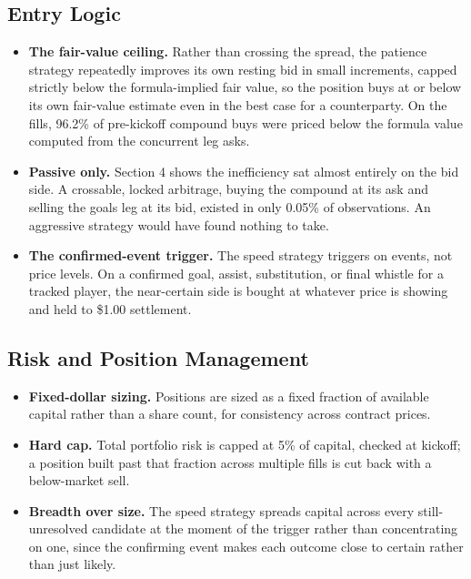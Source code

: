 \documentclass[12pt]{article}
\begin{document}
\subsection{Entry Logic}
\begin{itemize}
\item \textbf{The fair-value ceiling.} Rather than crossing the spread, the
patience strategy repeatedly improves its own resting bid in small increments,
capped strictly below the formula-implied fair value, so the position buys at or
below its own fair-value estimate even in the best case for a counterparty. On
the fills, 96.2\% of pre-kickoff compound buys were priced below the formula
value computed from the concurrent leg asks.
\item \textbf{Passive only.} Section 4 shows the inefficiency sat almost entirely
on the bid side. A crossable, locked arbitrage, buying the compound at its ask
and selling the goals leg at its bid, existed in only 0.05\% of observations. An
aggressive strategy would have found nothing to take.
\item \textbf{The confirmed-event trigger.} The speed strategy triggers on
events, not price levels. On a confirmed goal, assist, substitution, or final
whistle for a tracked player, the near-certain side is bought at whatever price
is showing and held to \$1.00 settlement.
\end{itemize}

\subsection{Risk and Position Management}
\begin{itemize}
\item \textbf{Fixed-dollar sizing.} Positions are sized as a fixed fraction of
available capital rather than a share count, for consistency across contract
prices.
\item \textbf{Hard cap.} Total portfolio risk is capped at 5\% of capital,
checked at kickoff; a position built past that fraction across multiple fills is
cut back with a below-market sell.
\item \textbf{Breadth over size.} The speed strategy spreads capital across every
still-unresolved candidate at the moment of the trigger rather than concentrating
on one, since the confirming event makes each outcome close to certain rather
than just likely.
\end{itemize}
\end{document}
